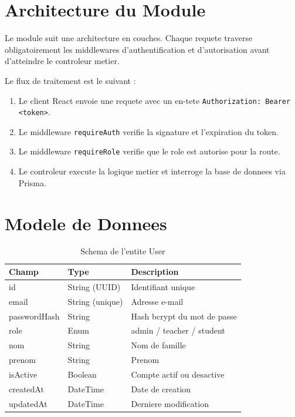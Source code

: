 \documentclass[12pt,a4paper]{report}
\begin{document}
\section{Architecture du Module}

Le module suit une architecture en couches. Chaque requete traverse
obligatoirement les middlewares d'authentification et d'autorisation
avant d'atteindre le controleur metier.

Le flux de traitement est le suivant :
\begin{enumerate}
  \item Le client React envoie une requete avec un en-tete
        \texttt{Authorization: Bearer <token>}.
  \item Le middleware \texttt{requireAuth} verifie la signature et
        l'expiration du token.
  \item Le middleware \texttt{requireRole} verifie que le role est
        autorise pour la route.
  \item Le controleur execute la logique metier et interroge la base de
        donnees via Prisma.
\end{enumerate}

\section{Modele de Donnees}

\begin{table}[H]
\centering
\caption{Schema de l'entite User}
\begin{tabular}{lll}
\toprule
\textbf{Champ} & \textbf{Type} & \textbf{Description} \\
\midrule
id           & String (UUID)    & Identifiant unique           \\
email        & String (unique)  & Adresse e-mail               \\
passwordHash & String           & Hash bcrypt du mot de passe  \\
role         & Enum             & admin / teacher / student    \\
nom          & String           & Nom de famille               \\
prenom       & String           & Prenom                       \\
isActive     & Boolean          & Compte actif ou desactive    \\
createdAt    & DateTime         & Date de creation             \\
updatedAt    & DateTime         & Derniere modification        \\
\bottomrule
\end{tabular}
\end{table}
\end{document}
